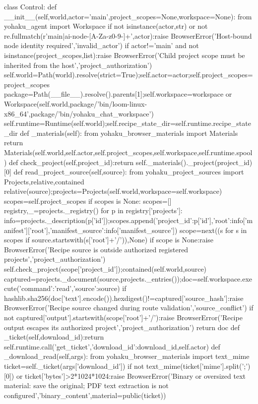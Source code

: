 class Control:
 def __init__(self,world,actor='main',project_scopes=None,workspace=None):
  from yohaku_agent import Workspace
  if not isinstance(actor,str) or not re.fullmatch(r'main|ai-node-[A-Za-z0-9-]+',actor):raise BrowserError('Host-bound node identity required','invalid_actor')
  if actor!='main' and not isinstance(project_scopes,list):raise BrowserError('Child project scope must be inherited from the host','project_authorization')
  self.world=Path(world).resolve(strict=True);self.actor=actor;self.project_scopes=project_scopes
  package=Path(__file__).resolve().parents[1];self.workspace=workspace or Workspace(self.world,package/'bin/loom-linux-x86_64',package/'bin/yohaku_chat_workspace')
  self.runtime=Runtime(self.world);self.recipe_state_dir=self.runtime.recipe_state_dir
 def _materials(self):
  from yohaku_browser_materials import Materials
  return Materials(self.world,self.actor,self.project_scopes,self.workspace,self.runtime.spool)
 def check_project(self,project_id):return self._materials()._project(project_id)[0]
 def read_project_source(self,source):
  from yohaku_project_sources import Projects,relative,contained
  relative(source);projects=Projects(self.world,workspace=self.workspace)
  scopes=self.project_scopes
  if scopes is None:
   scopes=[]
   registry,_=projects._registry()
   for p in registry['projects']:
    info=projects._description(p['id']);scopes.append({'project_id':p['id'],'root':info['manifest']['root'],'manifest_source':info['manifest_source']})
  scope=next((s for s in scopes if source.startswith(s['root']+'/')),None)
  if scope is None:raise BrowserError('Recipe source is outside authorized registered projects','project_authorization')
  self.check_project(scope['project_id']);contained(self.world,source)
  captured=projects._document(source,projects._entries());doc=self.workspace.execute({'command':'read','source':source})
  if hashlib.sha256(doc['text'].encode()).hexdigest()!=captured['source_hash']:raise BrowserError('Recipe source changed during route validation','source_conflict')
  if not captured['output'].startswith(scope['root']+'/'):raise BrowserError('Recipe output escapes its authorized project','project_authorization')
  return doc
 def _ticket(self,download_id):return self.runtime.call('get_ticket',{'download_id':download_id},self.actor)
 def _download_read(self,args):
  from yohaku_browser_materials import text_mime
  ticket=self._ticket(args['download_id'])
  if not text_mime(ticket['mime'].split(';')[0]) or ticket['bytes']>2*1024*1024:raise BrowserError('Binary or oversized text material: save the original; PDF text extraction is not configured','binary_content',material=public(ticket))
